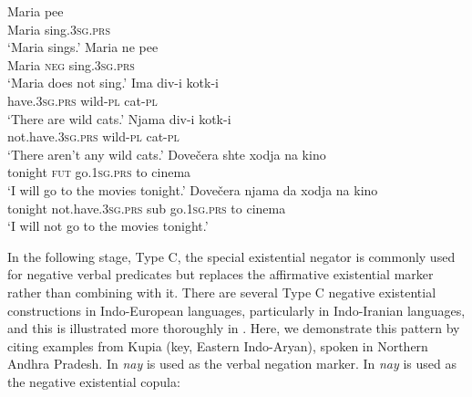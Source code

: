 \documentclass[output=paper]{langsci/langscibook}
\begin{document}
\begin{exe}\ex\label{ex:ieur-bulgarian-negators}
\begin{xlist}
\ex
    \gll Maria pee \\
Maria sing.\textsc{3sg}.\textsc{prs} \\
    \glt `Maria sings.'
\ex
\gll Maria ne pee \\
Maria \textsc{neg} sing.\textsc{3sg}.\textsc{prs} \\
\glt `Maria does not sing.'
\ex\gll Ima div-i kotk-i \\ 
   have.\textsc{3sg}.\textsc{prs} wild-\textsc{pl} cat-\textsc{pl} \\
\glt `There are wild cats.'
\ex\gll Njama div-i kotk-i \\
not.have.\textsc{3sg}.\textsc{prs} wild-\textsc{pl} cat-\textsc{pl} \\
\glt `There aren't any wild cats.'
\ex\gll Dovečera shte xodja na kino \\
tonight     \textsc{fut} go.\textsc{1sg}.\textsc{prs}  to cinema \\
\glt `I will go to the movies tonight.'
\ex\gll Dovečera njama                  da   xodja          na  kino\\
tonight not.have.\textsc{3sg}.\textsc{prs} sub go.\textsc{1sg.prs} to
cinema \\
\glt `I will not go to the movies tonight.'
    \end{xlist}\end{exe}

In the following stage, Type C, the special existential negator is commonly
used for negative verbal predicates but replaces the affirmative
existential marker rather than combining with it. There are several Type C
negative existential constructions in Indo-European languages, particularly
in Indo-Iranian languages, and this is illustrated more thoroughly in
. Here, we demonstrate this pattern by citing
examples from Kupia (key, Eastern Indo-Aryan), spoken in Northern Andhra
Pradesh. In  \textit{nay} is used as the verbal
negation marker. In  \textit{nay} is used as the negative existential copula:
\end{document}
